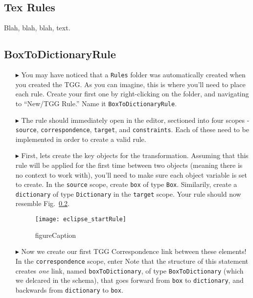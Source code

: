 \newpage
\hypertarget{rules tex}{}
\subsection{Tex Rules}
\texHeader


Blah, blah, blah, text.

\subsection{BoxToDictionaryRule}

\begin{itemize}

\item[$\blacktriangleright$] You may have noticed that a \texttt{Rules} folder was automatically created when you created the TGG. As you can imagine, this is
where you'll need to place each rule. Create your first one by right-clicking on the folder, and navigating to ``New/TGG Rule.'' Name it
\texttt{BoxToDictionaryRule}.

\item[$\blacktriangleright$] The rule should immediately open in the editor, sectioned into four scopes - \texttt{source}, \texttt{correspondence},
\texttt{target}, and \texttt{constraints}. Each of these need to be implemented in order to create a valid rule.

\item[$\blacktriangleright$] First, lets create the key objects for the transformation. Assuming that this rule will be applied for the first time between two
objects (meaning there is no context to work with), you'll need to make sure each object variable is set to create. In the \texttt{source} scope, create
\texttt{box} of type \texttt{Box}. Similarily, create a \texttt{dictionary} of type \texttt{Dictionary} in the \texttt{target} scope. Your rule should now
resemble Fig.~\ref{}.

\begin{figure}[htbp]
\begin{center}
  \texttt{[image: eclipse\_startRule]}
  \caption{figureCaption}
  \label{fig:textSourceRule}
\end{center}
\end{figure}

\item[$\blacktriangleright$] Now we create our first TGG Correspondence link between these elements! In the \texttt{correspondence} scope, enter 
Note that the structure of this statement creates \emph{one} link, named \texttt{boxToDictionary}, of type \texttt{BoxToDictionary} (which we delcared in the
schema), that goes forward from \texttt{box} to \texttt{dictionary}, and backwards from \texttt{dictionary} to \texttt{box}.


\end{itemize}
